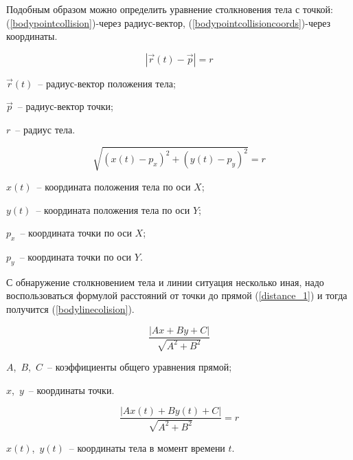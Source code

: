 Подобным образом можно определить уравнение столкновения тела с точкой:
(\ref{bodypointcollision})-через радиус-вектор, (\ref{bodypointcollisioncoords})-через координаты.

\begin{equation}\label{bodypointcollision}
  \left|\vec{r}(t) - \vec{p}\right| = r
\end{equation}
\begin{Underequation}
  \(\vec{r}(t)\)~-- радиус-вектор положения тела;

  \(\vec{p}\)~-- радиус-вектор точки;

  \(r\)~-- радиус тела.
\end{Underequation}

\begin{equation}\label{bodypointcollisioncoords}
  \sqrt{(x(t) - p_x)^2 + (y(t) - p_y)^2} = r
\end{equation}

\begin{Underequation}
  \(x(t)\)~-- координата положения тела по оси \(X\);

  \(y(t)\)~-- координата положения тела по оси \(Y\);

  \(p_x\)~-- координата точки по оси \(X\);

  \(p_y\)~-- координата точки по оси \(Y\).
\end{Underequation}

С обнаружение столкновением тела и линии ситуация несколько иная,
надо воспользоваться формулой расстояний от точки до прямой (\ref{distance_1}) \cite[с. 452]{larson}
и тогда получится (\ref{bodylinecolision}).

\begin{equation}\label{distance_1}
  \frac{\left|Ax + By + C\right|}{\sqrt{A^2 + B^2}}
\end{equation}

\begin{Underequation}
  \(A\),~\(B\),~\(C\)~-- коэффициенты общего уравнения прямой;

  \(x\),~\(y\)~-- координаты точки.
\end{Underequation}

\begin{equation}\label{bodylinecolision}
  \frac{\left|A x(t) + B y(t) + C\right|}{\sqrt{A^2 + B^2}} = r
\end{equation}

\begin{Underequation}
  \(x(t)\),~\(y(t)\)~-- координаты тела в момент времени \(t\).
\end{Underequation}

